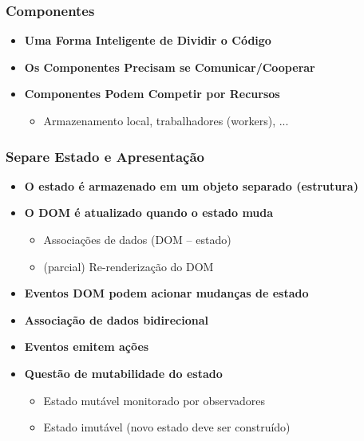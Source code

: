 \documentclass{beamer}
\begin{document}
\begin{frame}
      \frametitle{Componentes}

      \begin{itemize}
            \item \textbf{Uma Forma Inteligente de Dividir o Código}

            \item \textbf{Os Componentes Precisam se Comunicar/Cooperar}

            \item \textbf{Componentes Podem Competir por Recursos}
                  \begin{itemize}
                        \item Armazenamento local, trabalhadores (workers), ...
                  \end{itemize}
      \end{itemize}

\end{frame}

\begin{frame}
      \frametitle{Separe Estado e Apresentação}

      \begin{itemize}
            \item \textbf{O estado é armazenado em um objeto separado (estrutura)}

            \item \textbf{O DOM é atualizado quando o estado muda}
                  \begin{itemize}
                        \item Associações de dados (DOM – estado)
                        \item (parcial) Re-renderização do DOM
                  \end{itemize}

            \item \textbf{Eventos DOM podem acionar mudanças de estado}

            \item \textbf{Associação de dados bidirecional}

            \item \textbf{Eventos emitem ações}

            \item \textbf{Questão de mutabilidade do estado}
                  \begin{itemize}
                        \item Estado mutável monitorado por observadores
                        \item Estado imutável (novo estado deve ser construído)
                  \end{itemize}
      \end{itemize}

\end{frame}
\end{document}
